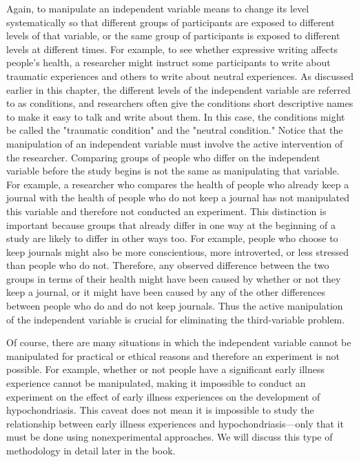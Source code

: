 Again, to manipulate an independent variable means to change its level systematically so that different groups of participants are exposed to different levels of that variable, or the same group of participants is exposed to different levels at different times. For example, to see whether expressive writing affects people's health, a researcher might instruct some participants to write about traumatic experiences and others to write about neutral experiences. As discussed earlier in this chapter, the different levels of the independent variable are referred to as conditions, and researchers often give the conditions short descriptive names to make it easy to talk and write about them. In this case, the conditions might be called the "traumatic condition" and the "neutral condition."
Notice that the manipulation of an independent variable must involve the active intervention of the researcher. Comparing groups of people who differ on the independent variable before the study begins is not the same as manipulating that variable. For example, a researcher who compares the health of people who already keep a journal with the health of people who do not keep a journal has not manipulated this variable and therefore not conducted
an experiment. This distinction is important because groups that already differ in one way at the beginning of a study are likely to differ in other ways too. For example, people who choose to keep journals might also be more conscientious, more introverted, or less stressed than people who do not. Therefore, any observed difference between the two groups in terms of their health might have been caused by whether or not they keep a journal, or it might have been caused by any of the other differences between people who do and do not keep journals. Thus the active manipulation of the independent variable is crucial for eliminating the third-variable problem.
 


 


Of course, there are many situations in which the independent variable cannot be manipulated for practical or ethical reasons and therefore an experiment is not possible. For example, whether or not people have a significant early illness experience cannot be manipulated, making it impossible to conduct an experiment on the effect of early illness experiences on the development of hypochondriasis. This caveat does not mean it is impossible to study the relationship between early illness experiences and hypochondriasis---only that it must be done using nonexperimental approaches. We will discuss this type of methodology in detail later in the book.
 


